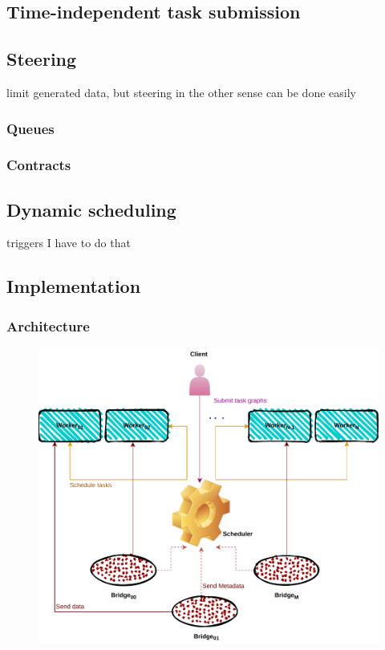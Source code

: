 \subsection{Time-independent task submission}

\subsection{Steering}
limit generated data, but steering in the other sense can be done easily  
\subsubsection{Queues}
\subsubsection{Contracts}
\subsection{Dynamic scheduling}
triggers I have to do that 

\subsection{Implementation}

\cite{deisa}

\subsubsection{Architecture}
\begin{figure}[tb]\centering
\includegraphics{figures/ArchiectureDeisa.pdf}
\caption{\deisa}
\label{figdeida}
\end{figure}

